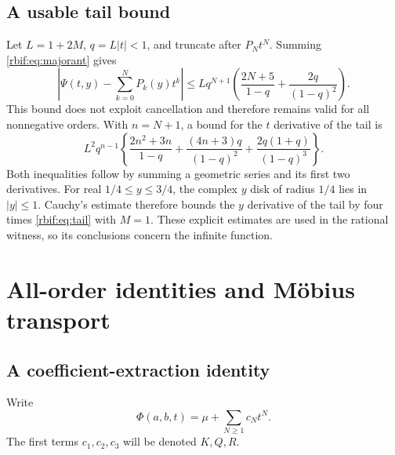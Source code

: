 \documentclass[11pt,a4paper]{article}
\theoremstyle{definition}\newtheorem{definition}[theorem]{Definition}
\theoremstyle{remark}\newtheorem{remark}[theorem]{Remark}
\numberwithin{equation}{section}
\begin{document}
\subsection{A usable tail bound}
Let $L=1+2M$, $q=L|t|<1$, and truncate after $P_Nt^N$. Summing
\eqref{rbif:eq:majorant} gives
\begin{equation}
 \left|\Psi(t,y)-\sum_{k=0}^NP_k(y)t^k\right|
 \le Lq^{N+1}\left(\frac{2N+5}{1-q}
                         +\frac{2q}{(1-q)^2}\right).
 \label{rbif:eq:tail}
\end{equation}
This bound does not exploit cancellation and therefore remains valid for
all nonnegative orders. With $n=N+1$, a bound for the $t$ derivative of
the tail is
\begin{equation}
 L^2q^{n-1}\left\{
 \frac{2n^2+3n}{1-q}+\frac{(4n+3)q}{(1-q)^2}
                  +\frac{2q(1+q)}{(1-q)^3}\right\}.
 \label{rbif:eq:tailt}
\end{equation}
Both inequalities follow by summing a geometric series and its first
two derivatives. For real $1/4\le y\le3/4$, the complex $y$ disk of
radius $1/4$ lies in $|y|\le1$. Cauchy's estimate therefore bounds the
$y$ derivative of the tail by four times \eqref{rbif:eq:tail} with $M=1$.
These explicit estimates are used in the rational witness, so its
conclusions concern the infinite function.

\section{All-order identities and M\"obius transport}
\label{rbif:sec:identities}
\subsection{A coefficient-extraction identity}
Write
\begin{equation}
 \Phi(a,b,t)=\mu+\sum_{N\ge1}c_Nt^N.
 \label{rbif:eq:cN}
\end{equation}
The first terms $c_1,c_2,c_3$ will be denoted $K,Q,R$.
\end{document}
